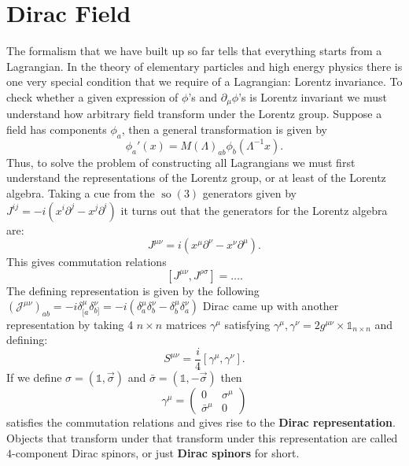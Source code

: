\documentclass{report}
\theoremstyle{plain}
\theoremstyle{definition}
\theoremstyle{remark}
\newcommand{\FR}[2]{\frac{#1}{#2}}
\newcommand{\mc}{\mathcal}
\newcommand{\gam}{\gamma}
\newcommand{\sg}{\sigma}
\newcommand{\di}{\partial}
\newcommand{\iden}{\mathds{1}}
\DeclareMathOperator{\so}{so}
\begin{document}
\section{Dirac Field}
The formalism that we have built up so far tells that everything starts
from a Lagrangian. In the theory of elementary particles and high energy
physics there is one very special condition that we require of a
Lagrangian: Lorentz invariance. To check whether a given expression of
$\phi$'s and $\di_\mu\phi$'s is Lorentz invariant we must understand how
arbitrary field transform under the Lorentz group. Suppose a field has
components $\phi_a$, then a general transformation is given by
\[ \phi_a'(x) = M(\Lambda)_{ab}\phi_b(\Lambda^{-1}x). \]
Thus, to solve the problem of constructing all Lagrangians we must first
understand the representations of the Lorentz group, or at least of the
Lorentz algebra. Taking a cue from the $\so(3)$ generators given by
$J^{ij}=-i(x^i\di^j-x^j\di^i)$ it turns out that the generators for the
Lorentz algebra are:
\[ J^{\mu\nu} = i(x^\mu\di^\nu-x^\nu\di^\mu).\]
This gives commutation relations
\[ [J^{\mu\nu},J^{\rho\sg}] = \dots .\]
The defining representation is given by the following$(\mc
J^{\mu\nu})_{ab} = -i\delta^\mu_{[a}\delta^\nu_{b]}
=-i(\delta^\mu_{a}\delta^\nu_{b} -\delta^\mu_{b}\delta^\nu_{a})$
Dirac came up with another representation by taking 4 $n\times n$ matrices
$\gam^\mu$ satisfying ${\gam^\mu,\gam^\nu} = 2g^{\mu\nu}\times
\iden_{n\times n}$ and defining:
\[ S^{\mu\nu} = \FR{i}{4}[\gam^\mu,\gam^\nu].\]
If we define $\sg = (\iden,\vec\sigma)$ and $\bar\sg = (\iden,-\vec\sg)$
then \[\gam^\mu = \begin{pmatrix}0&\sg^\mu\\\bar\sg^\mu&0 \end{pmatrix}\] satisfies
the commutation relations and gives rise to the \textbf{Dirac
representation}. Objects that transform under that transform under this
representation are called $4$-component Dirac spinors, or just \textbf{Dirac
spinors} for short. 
\end{document}
